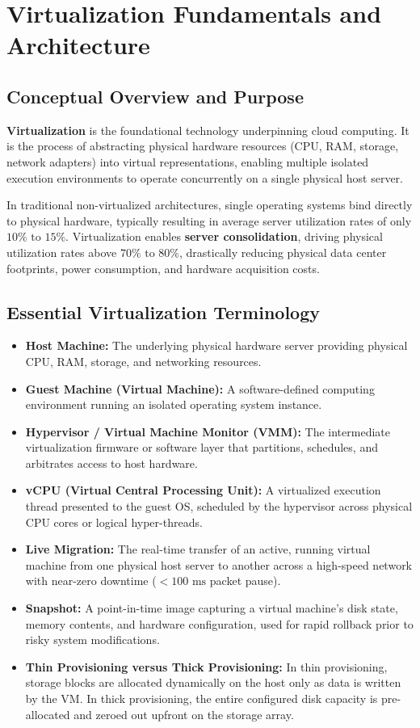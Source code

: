 \section{Virtualization Fundamentals and Architecture}
\label{sec:virtualization_fundamentals}

\subsection{Conceptual Overview and Purpose}
\textbf{Virtualization} is the foundational technology underpinning cloud computing. It is the process of abstracting physical hardware resources (CPU, RAM, storage, network adapters) into virtual representations, enabling multiple isolated execution environments to operate concurrently on a single physical host server.

In traditional non-virtualized architectures, single operating systems bind directly to physical hardware, typically resulting in average server utilization rates of only $10\%\text{ to }15\%$. Virtualization enables \textbf{server consolidation}, driving physical utilization rates above $70\%\text{ to }80\%$, drastically reducing physical data center footprints, power consumption, and hardware acquisition costs.

\subsection{Essential Virtualization Terminology}
\begin{itemize}
    \item \textbf{Host Machine:} The underlying physical hardware server providing physical CPU, RAM, storage, and networking resources.
    \item \textbf{Guest Machine (Virtual Machine):} A software-defined computing environment running an isolated operating system instance.
    \item \textbf{Hypervisor / Virtual Machine Monitor (VMM):} The intermediate virtualization firmware or software layer that partitions, schedules, and arbitrates access to host hardware.
    \item \textbf{vCPU (Virtual Central Processing Unit):} A virtualized execution thread presented to the guest OS, scheduled by the hypervisor across physical CPU cores or logical hyper-threads.
    \item \textbf{Live Migration:} The real-time transfer of an active, running virtual machine from one physical host server to another across a high-speed network with near-zero downtime ($<100\text{ ms}$ packet pause).
    \item \textbf{Snapshot:} A point-in-time image capturing a virtual machine's disk state, memory contents, and hardware configuration, used for rapid rollback prior to risky system modifications.
    \item \textbf{Thin Provisioning versus Thick Provisioning:} In thin provisioning, storage blocks are allocated dynamically on the host only as data is written by the VM. In thick provisioning, the entire configured disk capacity is pre-allocated and zeroed out upfront on the storage array.
\end{itemize}


